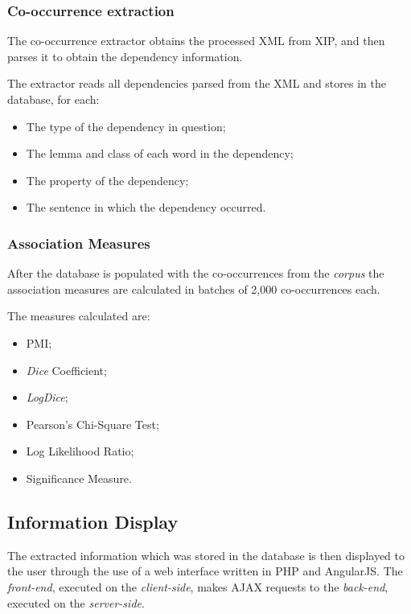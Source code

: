 \subsubsection*{Co-occurrence extraction}

The co-occurrence extractor obtains the processed XML from XIP, and then parses
it to obtain the dependency information.

The extractor reads all dependencies parsed from the XML and stores in the
database, for each:

\begin{itemize}
  \item The type of the dependency in question;
  \item The lemma and class of each word in the dependency;
  \item The property of the dependency;
  \item The sentence in which the dependency occurred.
\end{itemize}

\subsubsection*{Association Measures}
\label{sec:assoc}

After the database is populated with the co-occurrences from the \textit{corpus}
the association measures are calculated in batches of 2,000 co-occurrences
each.

The measures calculated are:

\begin{itemize}
  \item \ac{PMI};
  \item \textit{Dice} Coefficient;
  \item \textit{LogDice};
  \item Pearson's Chi-Square Test;
  \item Log Likelihood Ratio;
  \item Significance Measure.
\end{itemize}

\subsection{Information Display}

The extracted information which was stored in the database is then displayed to
the user through the use of a web interface written in \ac{PHP} and AngularJS.
The \emph{front-end}, executed on the \emph{client-side}, makes \ac{AJAX}
requests to the \emph{back-end}, executed on the \emph{server-side}.

